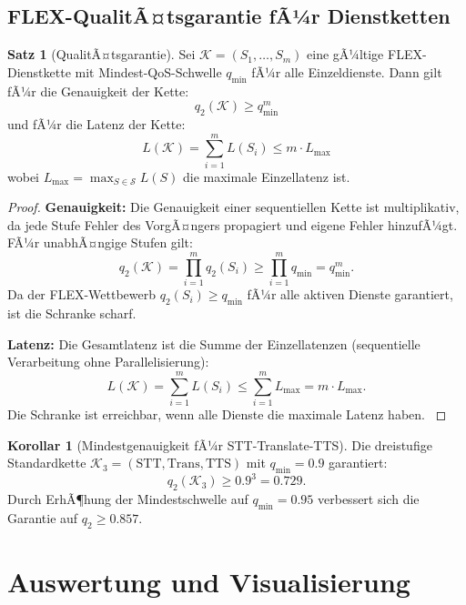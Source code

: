 ﻿\documentclass[a4paper,12pt]{article}
\theoremstyle{definition}
\newtheorem{satz}{Satz}
\newtheorem{korollar}{Korollar}
\begin{document}
\subsection{FLEX-QualitÃ¤tsgarantie fÃ¼r Dienstketten}

\begin{satz}[QualitÃ¤tsgarantie]
\label{satz:qualitaet}
Sei $\mathcal{K} = (S_1, \ldots, S_m)$ eine gÃ¼ltige FLEX-Dienstkette mit Mindest-QoS-Schwelle $q_\mathrm{min}$ fÃ¼r alle Einzeldienste. Dann gilt fÃ¼r die Genauigkeit der Kette:
\[
    q_2(\mathcal{K}) \geq q_\mathrm{min}^m
\]
und fÃ¼r die Latenz der Kette:
\[
    L(\mathcal{K}) = \sum_{i=1}^m L(S_i) \leq m \cdot L_\mathrm{max}
\]
wobei $L_\mathrm{max} = \max_{S \in \mathcal{S}} L(S)$ die maximale Einzellatenz ist.
\end{satz}

\begin{proof}
\textbf{Genauigkeit:} Die Genauigkeit einer sequentiellen Kette ist multiplikativ, da jede Stufe Fehler des VorgÃ¤ngers propagiert und eigene Fehler hinzufÃ¼gt. FÃ¼r unabhÃ¤ngige Stufen gilt:
\[
q_2(\mathcal{K}) = \prod_{i=1}^m q_2(S_i) \geq \prod_{i=1}^m q_\mathrm{min} = q_\mathrm{min}^m.
\]
Da der FLEX-Wettbewerb $q_2(S_i) \geq q_\mathrm{min}$ fÃ¼r alle aktiven Dienste garantiert, ist die Schranke scharf.

\textbf{Latenz:} Die Gesamtlatenz ist die Summe der Einzellatenzen (sequentielle Verarbeitung ohne Parallelisierung):
\[
L(\mathcal{K}) = \sum_{i=1}^m L(S_i) \leq \sum_{i=1}^m L_\mathrm{max} = m \cdot L_\mathrm{max}.
\]
Die Schranke ist erreichbar, wenn alle Dienste die maximale Latenz haben. $
$
\end{proof}

\begin{korollar}[Mindestgenauigkeit fÃ¼r STT-Translate-TTS]
Die dreistufige Standardkette $\mathcal{K}_3 = (\mathrm{STT}, \mathrm{Trans}, \mathrm{TTS})$ mit $q_\mathrm{min} = 0.9$ garantiert:
\[
q_2(\mathcal{K}_3) \geq 0.9^3 = 0.729.
\]
Durch ErhÃ¶hung der Mindestschwelle auf $q_\mathrm{min} = 0.95$ verbessert sich die Garantie auf $q_2 \geq 0.857$.
\end{korollar}

\section{Auswertung und Visualisierung}
\label{sec:auswertung}
\end{document}

